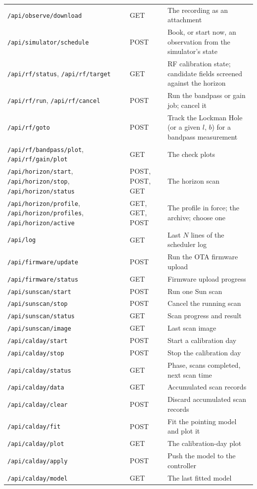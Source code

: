 \documentclass[11pt,a4paper]{article}
\begin{document}
\begin{longtable}{llp{7.6cm}}
\texttt{/api/observe/download} & GET & The recording as an attachment \\
\texttt{/api/simulator/schedule} & POST & Book, or start now, an observation from the simulator's state \\
\texttt{/api/rf/status}, \texttt{/api/rf/target} & GET & RF calibration state; candidate fields screened against the horizon \\
\texttt{/api/rf/run}, \texttt{/api/rf/cancel} & POST & Run the bandpass or gain job; cancel it \\
\texttt{/api/rf/goto} & POST & Track the Lockman Hole (or a given $l$, $b$) for a bandpass measurement \\
\texttt{/api/rf/bandpass/plot}, \texttt{/api/rf/gain/plot} & GET & The check plots \\
\texttt{/api/horizon/start}, \texttt{/api/horizon/stop}, \texttt{/api/horizon/status} & POST, POST, GET & The horizon scan \\
\texttt{/api/horizon/profile}, \texttt{/api/horizon/profiles}, \texttt{/api/horizon/active} & GET, GET, POST & The profile in force; the archive; choose one \\
\texttt{/api/log} & GET & Last $N$ lines of the scheduler log \\
\texttt{/api/firmware/update} & POST & Run the OTA firmware upload \\
\texttt{/api/firmware/status} & GET & Firmware upload progress \\
\texttt{/api/sunscan/start} & POST & Run one Sun scan \\
\texttt{/api/sunscan/stop} & POST & Cancel the running scan \\
\texttt{/api/sunscan/status} & GET & Scan progress and result \\
\texttt{/api/sunscan/image} & GET & Last scan image \\
\texttt{/api/calday/start} & POST & Start a calibration day \\
\texttt{/api/calday/stop} & POST & Stop the calibration day \\
\texttt{/api/calday/status} & GET & Phase, scans completed, next scan time \\
\texttt{/api/calday/data} & GET & Accumulated scan records \\
\texttt{/api/calday/clear} & POST & Discard accumulated scan records \\
\texttt{/api/calday/fit} & POST & Fit the pointing model and plot it \\
\texttt{/api/calday/plot} & GET & The calibration-day plot \\
\texttt{/api/calday/apply} & POST & Push the model to the controller \\
\texttt{/api/calday/model} & GET & The last fitted model \\
\bottomrule
\end{longtable}
\end{document}
